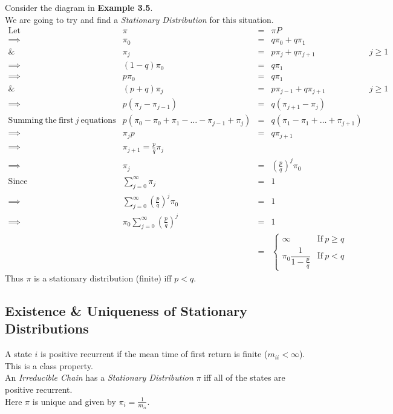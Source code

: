 \documentclass[11pt,a4paper]{article}
\begin{document}
Consider the diagram in \textbf{Example 3.5}.\\
We are going to try and find a \textit{Stationary Distribution} for this situation.\\
\[\begin{array}{rrcll}
\mathrm{Let}&\pi&=&\pi P\\
\implies&\pi_0&=&q\pi_0+q\pi_1\\
\&&\pi_j&=&p\pi_j+q\pi_{j+1}&j\geq1\\
\implies&(1-q)\pi_0&=&q\pi_1\\
\implies&p\pi_0&=&q\pi_1\\
\&&(p+q)\pi_j&=&p\pi_{j-1}+q\pi_{j+1}&j\geq1\\
\implies&p(\pi_j-\pi_{j-1})&=&q(\pi_{j+1}-\pi_j)\\
\mathrm{Summing\ the\ first\ }j\mathrm{\ equations}&p(\pi_0-\pi_0+\pi_1-\dots-\pi_{j-1}+\pi_j)&=&q(\pi_1-\pi_1+\dots+\pi_{j+1})\\
\implies&\pi_jp&=&q\pi_{j+1}\\
\implies&\pi_{j+1}=\frac{p}{q}\pi_j\\
\implies&\pi_j&=&\left(\frac{p}{q}\right)^j\pi_0\\
\mathrm{Since}&\sum_{j=0}^\infty\pi_j&=&1\\
\implies&\sum_{j=0}^\infty\left(\frac{p}{q}\right)^j\pi_0&=&1\\
\implies&\pi_0\sum_{j=0}^\infty\left(\frac{p}{q}\right)^j&=&1\\
&&=&\begin{cases}
\infty&\mathrm{If\ }p\geq q\\
\pi_0\dfrac{1}{1-\frac{p}{q}}&\mathrm{If\ }p<q
\end{cases}
\end{array}\]
Thus $\pi$ is a stationary distribution (finite) iff $p<q$.\\

\subsection{Existence \& Uniqueness of Stationary Distributions}

A state $i$ is positive recurrent if the mean time of first return is finite ($m_{ii}<\infty$).\\
\nb This is a class property.\\

An \textit{Irreducible Chain} has a \textit{Stationary Distribution} $\pi$ iff all of the states are positive recurrent.\\
Here $\pi$ is unique and given by $\pi_i=\frac{1}{m_{ii}}$.\\
\end{document}
